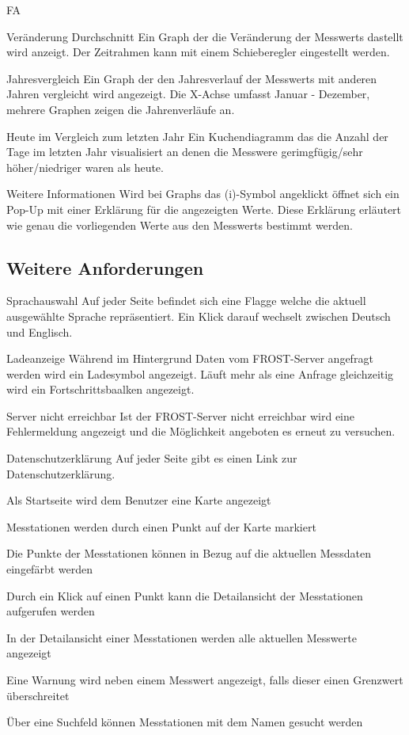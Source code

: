 \begin{Kriterien}{FA}
 \item[Veränderung Durchschnitt]
   Ein Graph der die Veränderung der \glspl{Messwert} dastellt wird anzeigt.
   Der Zeitrahmen kann mit einem Schieberegler eingestellt werden.

 \item[Jahresvergleich]
   Ein Graph der den Jahresverlauf der \glspl{Messwert} mit anderen Jahren vergleicht wird angezeigt.
   Die X-Achse umfasst Januar - Dezember, mehrere Graphen zeigen die Jahrenverläufe an.

 \item[Heute im Vergleich zum letzten Jahr]
   Ein \gls{Kuchendiagramm} das die Anzahl der Tage im letzten Jahr visualisiert an denen die Messwere gerimgfügig/sehr höher/niedriger waren als heute.

 \item[Weitere Informationen]
   Wird bei \glspl{Graph} das (i)-Symbol angeklickt öffnet sich ein \gls{Pop-Up} mit einer Erklärung für die angezeigten Werte.
   Diese Erklärung erläutert wie genau die vorliegenden Werte aus den \glspl{Messwert} bestimmt werden.

\subsection{Weitere Anforderungen}

 \item[Sprachauswahl]
   Auf jeder Seite befindet sich eine Flagge welche die aktuell ausgewählte Sprache repräsentiert.
   Ein Klick darauf wechselt zwischen Deutsch und Englisch.

 \item[Ladeanzeige]
  Während im Hintergrund Daten vom \gls{FROST-Server} angefragt werden wird ein Ladesymbol angezeigt.
  Läuft mehr als eine Anfrage gleichzeitig wird ein Fortschrittsbaalken angezeigt.

 \item[Server nicht erreichbar]
  Ist der \gls{FROST-Server} nicht erreichbar wird eine Fehlermeldung angezeigt und die Möglichkeit angeboten es erneut zu versuchen.

 \item[Datenschutzerklärung]
  Auf jeder Seite gibt es einen Link zur Datenschutzerklärung.

    \item Als Startseite wird dem Benutzer eine Karte angezeigt
    \item Messtationen werden durch einen Punkt auf der Karte markiert
    \item Die Punkte der Messtationen können in Bezug auf die aktuellen Messdaten eingefärbt werden
    \item Durch ein Klick auf einen Punkt kann die Detailansicht der Messtationen aufgerufen werden
    \item In der Detailansicht einer Messtationen werden alle aktuellen Messwerte angezeigt
    \item Eine Warnung wird neben einem Messwert angezeigt, falls dieser einen Grenzwert überschreitet
    \item Über eine Suchfeld können Messtationen mit dem Namen gesucht werden
\end{Kriterien}